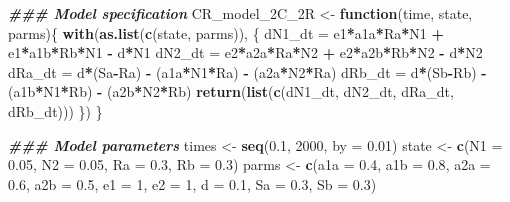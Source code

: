 \documentclass[
]{book}
\newenvironment{Shaded}{\begin{snugshade}}{\end{snugshade}}
\newcommand{\AttributeTok}[1]{\textcolor[rgb]{0.13,0.29,0.53}{#1}}
\newcommand{\ControlFlowTok}[1]{\textcolor[rgb]{0.13,0.29,0.53}{\textbf{#1}}}
\newcommand{\DecValTok}[1]{\textcolor[rgb]{0.00,0.00,0.81}{#1}}
\newcommand{\DocumentationTok}[1]{\textcolor[rgb]{0.56,0.35,0.01}{\textbf{\textit{#1}}}}
\newcommand{\FloatTok}[1]{\textcolor[rgb]{0.00,0.00,0.81}{#1}}
\newcommand{\FunctionTok}[1]{\textcolor[rgb]{0.13,0.29,0.53}{\textbf{#1}}}
\newcommand{\NormalTok}[1]{#1}
\newcommand{\OtherTok}[1]{\textcolor[rgb]{0.56,0.35,0.01}{#1}}
\newcommand{\SpecialCharTok}[1]{\textcolor[rgb]{0.81,0.36,0.00}{\textbf{#1}}}
\begin{document}
\begin{Shaded}
\begin{Highlighting}[]
\DocumentationTok{\#\#\# Model specification}
\NormalTok{CR\_model\_2C\_2R }\OtherTok{\textless{}{-}} \ControlFlowTok{function}\NormalTok{(time, state, parms)\{}
  \FunctionTok{with}\NormalTok{(}\FunctionTok{as.list}\NormalTok{(}\FunctionTok{c}\NormalTok{(state, parms)), \{}
\NormalTok{    dN1\_dt }\OtherTok{=}\NormalTok{ e1}\SpecialCharTok{*}\NormalTok{a1a}\SpecialCharTok{*}\NormalTok{Ra}\SpecialCharTok{*}\NormalTok{N1 }\SpecialCharTok{+}\NormalTok{ e1}\SpecialCharTok{*}\NormalTok{a1b}\SpecialCharTok{*}\NormalTok{Rb}\SpecialCharTok{*}\NormalTok{N1 }\SpecialCharTok{{-}}\NormalTok{ d}\SpecialCharTok{*}\NormalTok{N1}
\NormalTok{    dN2\_dt }\OtherTok{=}\NormalTok{ e2}\SpecialCharTok{*}\NormalTok{a2a}\SpecialCharTok{*}\NormalTok{Ra}\SpecialCharTok{*}\NormalTok{N2 }\SpecialCharTok{+}\NormalTok{ e2}\SpecialCharTok{*}\NormalTok{a2b}\SpecialCharTok{*}\NormalTok{Rb}\SpecialCharTok{*}\NormalTok{N2 }\SpecialCharTok{{-}}\NormalTok{ d}\SpecialCharTok{*}\NormalTok{N2}
\NormalTok{    dRa\_dt }\OtherTok{=}\NormalTok{ d}\SpecialCharTok{*}\NormalTok{(Sa}\SpecialCharTok{{-}}\NormalTok{Ra) }\SpecialCharTok{{-}}\NormalTok{ (a1a}\SpecialCharTok{*}\NormalTok{N1}\SpecialCharTok{*}\NormalTok{Ra) }\SpecialCharTok{{-}}\NormalTok{ (a2a}\SpecialCharTok{*}\NormalTok{N2}\SpecialCharTok{*}\NormalTok{Ra) }
\NormalTok{    dRb\_dt }\OtherTok{=}\NormalTok{ d}\SpecialCharTok{*}\NormalTok{(Sb}\SpecialCharTok{{-}}\NormalTok{Rb) }\SpecialCharTok{{-}}\NormalTok{ (a1b}\SpecialCharTok{*}\NormalTok{N1}\SpecialCharTok{*}\NormalTok{Rb) }\SpecialCharTok{{-}}\NormalTok{ (a2b}\SpecialCharTok{*}\NormalTok{N2}\SpecialCharTok{*}\NormalTok{Rb)}
    \FunctionTok{return}\NormalTok{(}\FunctionTok{list}\NormalTok{(}\FunctionTok{c}\NormalTok{(dN1\_dt, dN2\_dt, dRa\_dt, dRb\_dt)))}
\NormalTok{  \})}
\NormalTok{\}}

\DocumentationTok{\#\#\# Model parameters}
\NormalTok{times }\OtherTok{\textless{}{-}} \FunctionTok{seq}\NormalTok{(}\FloatTok{0.1}\NormalTok{, }\DecValTok{2000}\NormalTok{, }\AttributeTok{by =} \FloatTok{0.01}\NormalTok{)}
\NormalTok{state }\OtherTok{\textless{}{-}} \FunctionTok{c}\NormalTok{(}\AttributeTok{N1 =} \FloatTok{0.05}\NormalTok{, }\AttributeTok{N2 =} \FloatTok{0.05}\NormalTok{, }\AttributeTok{Ra =} \FloatTok{0.3}\NormalTok{, }\AttributeTok{Rb =} \FloatTok{0.3}\NormalTok{)}
\NormalTok{parms }\OtherTok{\textless{}{-}} \FunctionTok{c}\NormalTok{(}\AttributeTok{a1a =} \FloatTok{0.4}\NormalTok{, }\AttributeTok{a1b =} \FloatTok{0.8}\NormalTok{, }\AttributeTok{a2a =} \FloatTok{0.6}\NormalTok{, }\AttributeTok{a2b =} \FloatTok{0.5}\NormalTok{, }\AttributeTok{e1 =} \DecValTok{1}\NormalTok{, }\AttributeTok{e2 =} \DecValTok{1}\NormalTok{, }\AttributeTok{d =} \FloatTok{0.1}\NormalTok{, }\AttributeTok{Sa =} \FloatTok{0.3}\NormalTok{, }\AttributeTok{Sb =} \FloatTok{0.3}\NormalTok{)  }


\end{Highlighting}
\end{Shaded}
\end{document}
